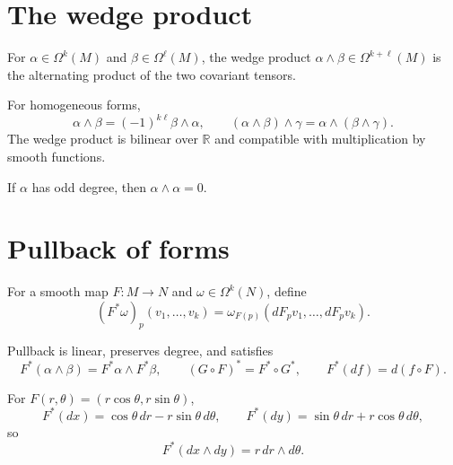 \section{The wedge product}
\begin{definition}\label{def:vii09-wedge}
For \(\alpha\in\Omega^k(M)\) and \(\beta\in\Omega^\ell(M)\), the wedge product \(\alpha\wedge\beta\in\Omega^{k+\ell}(M)\) is the alternating product of the two covariant tensors.
\end{definition}

\begin{theorem}\label{thm:vii09-wedge-laws}
For homogeneous forms,
\[
\alpha\wedge\beta=(-1)^{k\ell}\beta\wedge\alpha,
\qquad
(\alpha\wedge\beta)\wedge\gamma=\alpha\wedge(\beta\wedge\gamma).
\]
The wedge product is bilinear over \(\mathbb R\) and compatible with multiplication by smooth functions.
\end{theorem}

\begin{corollary}\label{cor:vii09-odd-square}
If \(\alpha\) has odd degree, then \(\alpha\wedge\alpha=0\).
\end{corollary}

\section{Pullback of forms}
\begin{definition}[Pullback]\label{def:vii09-pullback}
For a smooth map \(F:M\to N\) and \(\omega\in\Omega^k(N)\), define
\[
(F^*\omega)_p(v_1,\ldots,v_k)
=\omega_{F(p)}(dF_pv_1,\ldots,dF_pv_k).
\]
\end{definition}

\begin{theorem}\label{thm:vii09-pullback-laws}
Pullback is linear, preserves degree, and satisfies
\[
F^*(\alpha\wedge\beta)=F^*\alpha\wedge F^*\beta,
\qquad
(G\circ F)^*=F^*\circ G^*,
\qquad
F^*(df)=d(f\circ F).
\]
\end{theorem}

\begin{example}\label{ex:vii09-polar}
For \(F(r,\theta)=(r\cos\theta,r\sin\theta)\),
\[
F^*(dx)=\cos\theta\,dr-r\sin\theta\,d\theta,
\qquad
F^*(dy)=\sin\theta\,dr+r\cos\theta\,d\theta,
\]
so
\[
F^*(dx\wedge dy)=r\,dr\wedge d\theta.
\]
\end{example}

